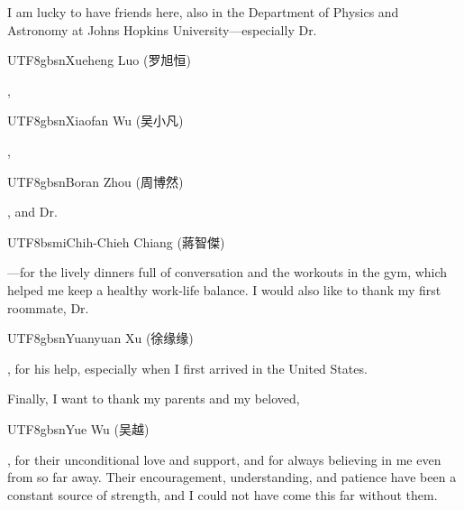 {I am lucky to have friends here, also in the Department of Physics and Astronomy at Johns Hopkins University---especially Dr.~\begin{CJK*}{UTF8}{gbsn}Xueheng Luo (罗旭恒)\end{CJK*}, \begin{CJK*}{UTF8}{gbsn}Xiaofan Wu (吴小凡)\end{CJK*}, \begin{CJK*}{UTF8}{gbsn}Boran Zhou (周博然)\end{CJK*}, and Dr.~\begin{CJK*}{UTF8}{bsmi}Chih-Chieh Chiang (蔣智傑)\end{CJK*}---for the lively dinners full of conversation and the workouts in the gym, which helped me keep a healthy work-life balance.
I would also like to thank my first roommate, Dr.~\begin{CJK*}{UTF8}{gbsn}Yuanyuan Xu (徐缘缘)\end{CJK*}, for his help, especially when I first arrived in the United States.

Finally, I want to thank my parents and my beloved, \begin{CJK*}{UTF8}{gbsn}Yue Wu (吴越)\end{CJK*}, for their unconditional love and support, and for always believing in me even from so far away.
Their encouragement, understanding, and patience have been a constant source of strength, and I could not have come this far without them.

}
